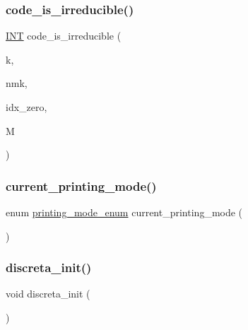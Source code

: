 \subsubsection{\texorpdfstring{code\+\_\+is\+\_\+irreducible()}{code\_is\_irreducible()}}
{\footnotesize\ttfamily \mbox{\hyperlink{galois_8h_a09fddde158a3a20bd2dcadb609de11dc}{I\+NT}} code\+\_\+is\+\_\+irreducible (\begin{DoxyParamCaption}\item[{\mbox{\hyperlink{galois_8h_a09fddde158a3a20bd2dcadb609de11dc}{I\+NT}}}]{k,  }\item[{\mbox{\hyperlink{galois_8h_a09fddde158a3a20bd2dcadb609de11dc}{I\+NT}}}]{nmk,  }\item[{\mbox{\hyperlink{galois_8h_a09fddde158a3a20bd2dcadb609de11dc}{I\+NT}}}]{idx\+\_\+zero,  }\item[{\mbox{\hyperlink{galois_8h_a09fddde158a3a20bd2dcadb609de11dc}{I\+NT}} $\ast$}]{M }\end{DoxyParamCaption})}

\mbox{\label{global_8_c_afcd81bfedce13a2f5f14361608e763f2}} 
\subsubsection{\texorpdfstring{current\+\_\+printing\+\_\+mode()}{current\_printing\_mode()}}
{\footnotesize\ttfamily enum \mbox{\hyperlink{discreta_8h_abd5a972aa69cb9eb5e94093a5ab1bf86}{printing\+\_\+mode\+\_\+enum}} current\+\_\+printing\+\_\+mode (\begin{DoxyParamCaption}{ }\end{DoxyParamCaption})}

\mbox{\label{global_8_c_a26c1fcfc028f99baaccd7da37c8688e7}} 
\subsubsection{\texorpdfstring{discreta\+\_\+init()}{discreta\_init()}}
{\footnotesize\ttfamily void discreta\+\_\+init (\begin{DoxyParamCaption}{ }\end{DoxyParamCaption})}

